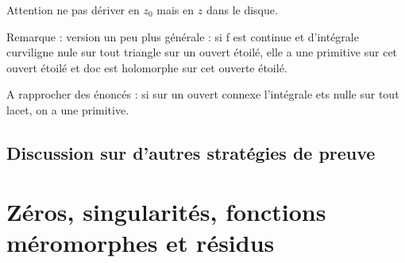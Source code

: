 \documentclass[11pt,a4paper]{book}
\theoremstyle{definition}
\theoremstyle{plain}
\begin{document}
Attention ne pas dériver en $z_0$ mais en $z$ dans le disque.

Remarque  : version un peu plus générale : si f est continue et d'intégrale curviligne nule sur tout triangle sur un ouvert étoilé, elle a une primitive sur cet ouvert étoilé et doc est holomorphe sur cet ouverte étoilé.

A rapprocher des énoncés : si sur un ouvert connexe l'intégrale ets nulle sur tout lacet, on a une primitive.




\section{Discussion sur d'autres stratégies de preuve}





\chapter{Zéros, singularités, fonctions méromorphes et résidus}
\end{document}

